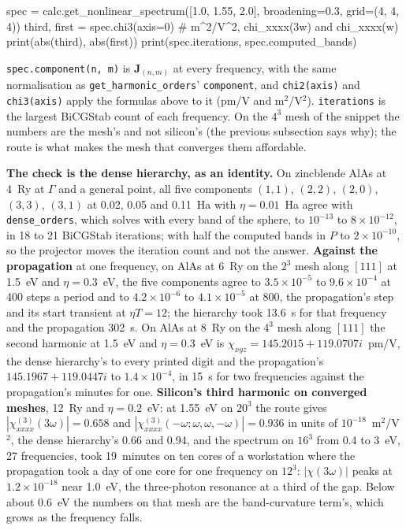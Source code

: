\documentclass[11pt,a4paper]{article}
\newcommand{\code}[1]{\texttt{\small #1}}
\begin{document}
\begin{pycode}
spec = calc.get_nonlinear_spectrum([1.0, 1.55, 2.0], broadening=0.3, grid=(4, 4, 4))
third, first = spec.chi3(axis=0)          # m^2/V^2, chi_xxxx(3w) and chi_xxxx(w)
print(abs(third), abs(first))
print(spec.iterations, spec.computed_bands)
\end{pycode}

\code{spec.component(n, m)} is $\mathbf J_{(n,m)}$ at every frequency, with the same
normalisation as \code{get\_harmonic\_orders}' \code{component}, and
\code{chi2(axis)} and \code{chi3(axis)} apply the formulas above to it (pm/V and
m$^2$/V$^2$). \code{iterations} is the largest BiCGStab count of each frequency.
On the $4^3$ mesh of the snippet the numbers are the mesh's and not silicon's
(the previous subsection says why); the route is what makes the mesh that
converges them affordable.

\textbf{The check is the dense hierarchy, as an identity.} On zincblende AlAs at
4~Ry at $\Gamma$ and a general point, all five components $(1,1)$, $(2,2)$,
$(2,0)$, $(3,3)$, $(3,1)$ at 0.02, 0.05 and 0.11~Ha with $\eta = 0.01$~Ha agree
with \code{dense\_orders}, which solves with every band of the sphere, to
$10^{-13}$ to $8\times10^{-12}$, in 18 to 21 BiCGStab iterations; with half the
computed bands in $P$ to $2\times10^{-10}$, so the projector moves the iteration
count and not the answer. \textbf{Against the propagation} at one frequency, on
AlAs at 6~Ry on the $2^3$ mesh along $[111]$ at 1.5~eV and $\eta = 0.3$~eV, the
five components agree to $3.5\times10^{-5}$ to $9.6\times10^{-4}$ at 400 steps a
period and to $4.2\times10^{-6}$ to $4.1\times10^{-5}$ at 800, the propagation's
step and its start transient at $\eta T = 12$; the hierarchy took 13.6~s for
that frequency and the propagation 302~s. On AlAs at 8~Ry on the $4^3$ mesh along
$[111]$ the second harmonic at 1.5~eV and $\eta = 0.3$~eV is
$\chi_{xyz} = 145.2015+119.0707i$~pm/V, the dense hierarchy's to every printed
digit and the propagation's $145.1967+119.0447i$ to $1.4\times10^{-4}$, in 15~s
for two frequencies against the propagation's minutes for one. \textbf{Silicon's third harmonic on converged meshes}, 12~Ry and
$\eta = 0.2$~eV: at 1.55~eV on $20^3$ the route gives $|\chi^{(3)}_{xxxx}(3\omega)| =
0.658$ and $|\chi^{(3)}_{xxxx}(-\omega;\omega,\omega,-\omega)| = 0.936$ in units of
$10^{-18}$~m$^2$/V$^2$, the dense hierarchy's 0.66 and 0.94, and the spectrum on $16^3$
from 0.4 to 3~eV, 27 frequencies, took 19~minutes on ten cores of a workstation where the
propagation took a day of one core for one frequency on $12^3$: $|\chi(3\omega)|$ peaks
at $1.2\times10^{-18}$ near 1.0~eV, the three-photon resonance at a third of the gap.
Below about 0.6~eV the numbers on that mesh are the band-curvature term's, which grows
as the frequency falls.
\end{document}
